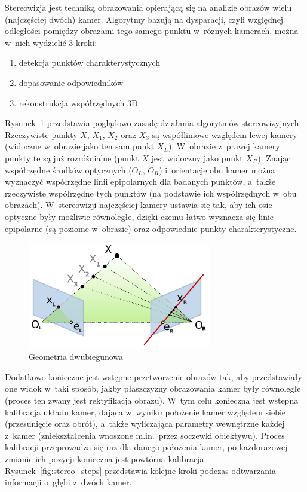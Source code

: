Stereowizja jest techniką obrazowania opierającą się na analizie obrazów wielu
(najczęściej dwóch) kamer. Algorytmy bazują na dysparacji, czyli względnej
odległości pomiędzy obrazami tego samego punktu w~różnych kamerach, można
w~nich wydzielić 3 kroki:

\begin{enumerate}
\item detekcja punktów charakterystycznych
\item dopasowanie odpowiedników
\item rekonstrukcja współrzędnych 3D
\end{enumerate}

Rysunek~\ref{fig:epipolar} przedstawia poglądowo zasadę działania algorytmów
stereowizyjnych. Rzeczywiste punkty $X$, $X_1$, $X_2$ oraz $X_3$ są współliniowe
względem lewej kamery (widoczne w~obrazie jako ten sam punkt $X_L$). W~obrazie
z~prawej kamery punkty te są już rozróżnialne (punkt $X$ jest widoczny jako punkt
$X_R$). Znając współrzędne środków optycznych ($O_L$, $O_R$) i~orientacje obu
kamer można wyznaczyć współrzędne linii epipolarnych dla badanych punktów,
a~także rzeczywiste współrzędne tych punktów (na podstawie ich współrzędnych
w~obu obrazach). W~stereowizji najczęściej kamery ustawia się tak, aby ich osie
optyczne były możliwie równoległe, dzięki czemu łatwo wyznacza się linie
epipolarne (są poziome w~obrazie) oraz odpowiednie punkty charakterystyczne.

\begin{figure}[h!]
\centering
\includegraphics[width=8cm]{../../Common/img/Epipolar_geometry}
\caption{Geometria dwubiegunowa}
\label{fig:epipolar}
\end{figure}

Dodatkowo konieczne jest wstępne przetworzenie obrazów tak, aby przedstawiały
one widok w~taki sposób, jakby płaszczyzny obrazowania kamer były równoległe
(proces ten zwany jest rektyfikacją obrazu). W~tym celu konieczna jest wstępna
kalibracja układu kamer, dająca w~wyniku położenie kamer względem siebie
(przesunięcie oraz obrót), a~także wyliczająca parametry wewnętrzne każdej
z~kamer (zniekształcenia wnoszone m.in.~przez soczewki obiektywu). Proces kalibracji
przeprowadza się raz dla danego położenia kamer, po każdorazowej zmianie ich
pozycji konieczna jest powtórna kalibracja. Rysunek~\ref{fig:stereo_steps}
przedstawia kolejne kroki podczas odtwarzania informacji o~głębi z~dwóch kamer.

